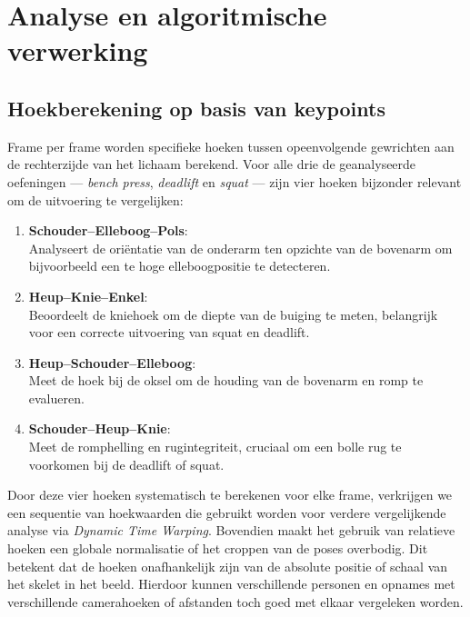 \chapter{Analyse en algoritmische verwerking}
\label{ch:algoritme}

\section{Hoekberekening op basis van keypoints}
Frame per frame worden specifieke hoeken tussen opeenvolgende gewrichten aan de rechterzijde van het lichaam berekend. 
Voor alle drie de geanalyseerde oefeningen — \textit{bench press}, \textit{deadlift} en \textit{squat} —  zijn vier hoeken bijzonder relevant om
 de uitvoering te vergelijken:

\begin{enumerate}
    \item \textbf{Schouder–Elleboog–Pols}: \\
    Analyseert de oriëntatie van de onderarm ten opzichte van de bovenarm om bijvoorbeeld een te hoge elleboogpositie te detecteren.
    
    \item \textbf{Heup–Knie–Enkel}: \\
    Beoordeelt de kniehoek om de diepte van de buiging te meten, belangrijk voor een correcte uitvoering van squat en deadlift.

    \item \textbf{Heup–Schouder–Elleboog}: \\
    Meet de hoek bij de oksel om de houding van de bovenarm en romp te evalueren.

    \item \textbf{Schouder–Heup–Knie}: \\
    Meet de romphelling en rugintegriteit, cruciaal om een bolle rug te voorkomen bij de deadlift of squat.
\end{enumerate}

Door deze vier hoeken systematisch te berekenen voor elke frame, verkrijgen we een sequentie van hoekwaarden die gebruikt worden voor verdere vergelijkende analyse via \textit{Dynamic Time Warping}.
Bovendien maakt het gebruik van relatieve hoeken een globale normalisatie of het croppen van de poses overbodig. 
Dit betekent dat de hoeken onafhankelijk zijn van de absolute positie of schaal van het skelet in het beeld. 
Hierdoor kunnen verschillende personen en opnames met verschillende camerahoeken of afstanden toch goed met elkaar vergeleken worden.

